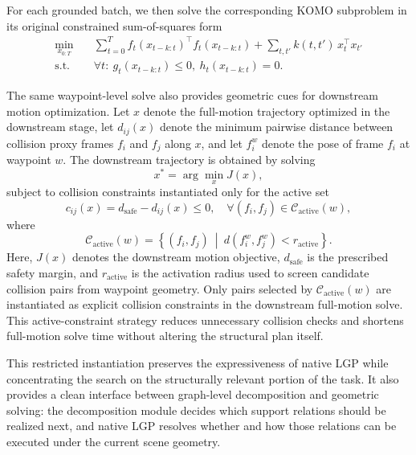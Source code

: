 \documentclass[journal]{IEEEtran}
\begin{document}
  For each grounded batch, we then solve the corresponding KOMO subproblem in
  its original constrained sum-of-squares form~\cite{cite_komo_2014}
  \begin{align}
    \min_{x_{0:T}}\quad
    &\sum_{t=0}^{T} f_t\!\left(x_{t-k:t}\right)^\top f_t\!\left(x_{t-k:t}\right)
    +\sum_{t,t'} k(t,t')\,x_t^\top x_{t'}
    \label{eq:komo_batch}\\
    \text{s.t.}\quad
    &\forall t:\ g_t\!\left(x_{t-k:t}\right)\le 0,\ h_t\!\left(x_{t-k:t}\right)=0.
    \label{eq:komo_batch_constraints}
  \end{align}

  The same waypoint-level solve also provides geometric cues for downstream
  motion optimization. Let $x$ denote the full-motion trajectory optimized in
  the downstream stage, let $d_{ij}(x)$ denote the minimum pairwise distance
  between collision proxy frames $f_i$ and $f_j$ along $x$, and let $f_i^w$ denote
  the pose of frame $f_i$ at waypoint $w$. The downstream trajectory is obtained
  by solving
  \begin{equation}
    x^* = \arg\min_x J(x),
    \label{eq:active_objective}
  \end{equation}
  subject to collision constraints instantiated only for the active set
  \begin{equation}
    c_{ij}(x) = d_{\mathrm{safe}} - d_{ij}(x) \leq 0,
    \quad \forall (f_i, f_j) \in \mathcal{C}_{\mathrm{active}}(w),
    \label{eq:active_constraints}
  \end{equation}
  where
  \begin{equation}
    \mathcal{C}_{\mathrm{active}}(w) =
    \left\{(f_i, f_j)\ \middle|\ d(f_i^w, f_j^w) < r_{\mathrm{active}}\right\}.
    \label{eq:active_set}
  \end{equation}
  Here, $J(x)$ denotes the downstream motion objective, $d_{\mathrm{safe}}$ is
  the prescribed safety margin, and $r_{\mathrm{active}}$ is the activation
  radius used to screen candidate collision pairs from waypoint geometry.
  Only pairs selected by $\mathcal{C}_{\mathrm{active}}(w)$ are instantiated
  as explicit collision constraints in the downstream full-motion solve. This
  active-constraint strategy reduces unnecessary collision checks and shortens
  full-motion solve time without altering the structural plan itself.

  This restricted instantiation preserves the expressiveness of native LGP while
  concentrating the search on the structurally relevant portion of the task. It
  also provides a clean interface between graph-level decomposition and
  geometric solving: the decomposition module decides which support relations should be
  realized next, and native LGP resolves whether and how those relations can be
  executed under the current scene geometry.
\end{document}
